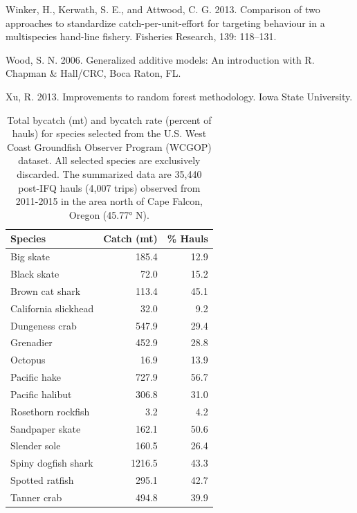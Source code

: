 \documentclass[]{article}
\begin{document}
\hypertarget{ref-winker2013a}{}
Winker, H., Kerwath, S. E., and Attwood, C. G. 2013. Comparison of two
approaches to standardize catch-per-unit-effort for targeting behaviour
in a multispecies hand-line fishery. Fisheries Research, 139: 118--131.

\hypertarget{ref-wood2006}{}
Wood, S. N. 2006. Generalized additive models: An introduction with R.
Chapman \& Hall/CRC, Boca Raton, FL.

\hypertarget{ref-xu2013}{}
Xu, R. 2013. Improvements to random forest methodology. Iowa State
University.

\pagebreak

\begin{table}

\caption{\label{tab:species-list}\label{tab:species-list}Total bycatch (mt) and bycatch rate (percent of hauls) for species selected from the U.S. West Coast Groundfish Observer Program (WCGOP) dataset. All selected species are exclusively discarded. The summarized data are 35,440 post-IFQ hauls (4,007 trips) observed from 2011-2015 in the area north of Cape Falcon, Oregon (45.77° N).}
\centering
\begin{tabular}[t]{lrr}
\toprule
Species & Catch (mt) & \% Hauls\\
\midrule
Big skate & 185.4 & 12.9\\
Black skate & 72.0 & 15.2\\
Brown cat shark & 113.4 & 45.1\\
California slickhead & 32.0 & 9.2\\
Dungeness crab & 547.9 & 29.4\\
\addlinespace
Grenadier & 452.9 & 28.8\\
Octopus & 16.9 & 13.9\\
Pacific hake & 727.9 & 56.7\\
Pacific halibut & 306.8 & 31.0\\
Rosethorn rockfish & 3.2 & 4.2\\
\addlinespace
Sandpaper skate & 162.1 & 50.6\\
Slender sole & 160.5 & 26.4\\
Spiny dogfish shark & 1216.5 & 43.3\\
Spotted ratfish & 295.1 & 42.7\\
Tanner crab & 494.8 & 39.9\\
\bottomrule
\end{tabular}
\end{table}

\pagebreak
\end{document}
